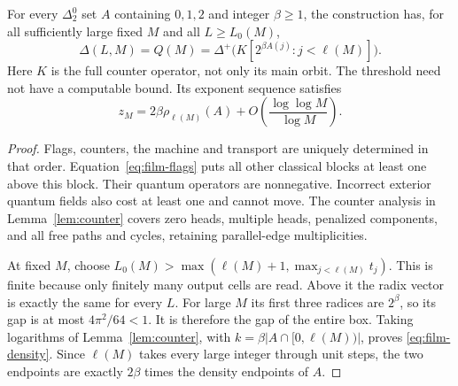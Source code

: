 \begin{theorem}\label{thm:film}
For every $\Delta^0_2$ set $A$ containing $0,1,2$ and integer
$\beta\geq1$, the construction has, for all sufficiently large fixed
$M$ and all $L\geq L_0(M)$,
\begin{equation}\label{eq:film-exact}
 \Delta(L,M)=Q(M)
 =\Delta^+\bigl(K[2^{\beta A(j)}:j<\ell(M)]\bigr).
\end{equation}
Here $K$ is the full counter operator, not only its main orbit.
The threshold need not have a computable bound. Its exponent sequence
satisfies
\begin{equation}\label{eq:film-density}
 z_M=2\beta\rho_{\ell(M)}(A)
           +O\!\left(\frac{\log\log M}{\log M}\right).
\end{equation}
\end{theorem}
\begin{proof}
Flags, counters, the machine and transport are uniquely determined in
that order. Equation~\eqref{eq:film-flags} puts all other classical
blocks at least one above this block. Their quantum operators are
nonnegative. Incorrect exterior quantum fields also cost at least one
and cannot move. The counter analysis in Lemma~\ref{lem:counter} covers
zero heads, multiple heads, penalized components, and all free paths
and cycles, retaining parallel-edge multiplicities.

At fixed $M$, choose
$L_0(M)>\max(\ell(M)+1,\max_{j<\ell(M)}t_j)$. This is finite because
only finitely many output cells are read. Above it the radix vector
is exactly the same for every $L$. For large $M$ its first three
radices are $2^\beta$, so its gap is at most $4\pi^2/64<1$.
It is therefore the gap of the entire box. Taking logarithms of
Lemma~\ref{lem:counter}, with
$k=\beta|A\cap[0,\ell(M))|$, proves \eqref{eq:film-density}.
Since $\ell(M)$ takes every large integer through unit steps, the two
endpoints are exactly $2\beta$ times the density endpoints of $A$.
\end{proof}

